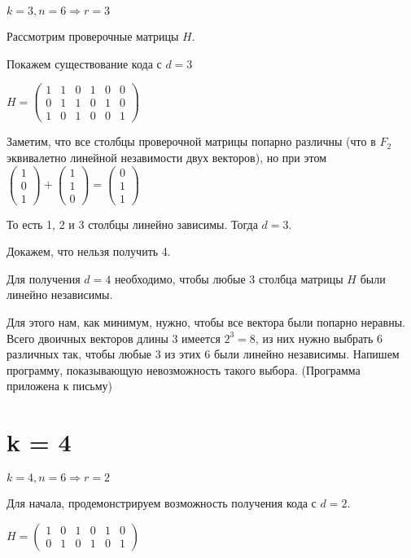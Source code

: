 \documentclass{article}
\begin{document}
	$k = 3, n = 6 \Rightarrow r = 3$
	
	Рассмотрим проверочные матрицы  $H$.
	
	Покажем существование кода с $d = 3$
	
	$
	H = \left(
	\begin{array}{cccccc}
	1&1&0&1&0&0\\
	0&1&1&0&1&0\\
	1&0&1&0&0&1
	\end{array}
	\right)
	$
	
	Заметим, что все столбцы проверочной матрицы попарно различны (что в $F_2$ эквивалетно линейной незавимости двух векторов), но при этом $
	\left(
	\begin{array}{cccccc}
	1\\
	0\\
	1
	\end{array}
	\right) + 
	\left(
	\begin{array}{cccccc}
	1\\
	1\\
	0
	\end{array}
	\right) = 
	\left(
	\begin{array}{cccccc}
	0\\
	1\\
	1
	\end{array}
	\right)
	$
	
	То есть 1, 2 и 3 столбцы линейно зависимы. Тогда $d = 3$.
	
	Докажем, что нельзя получить 4.
	
	Для получения $d = 4$ необходимо, чтобы любые 3 столбца матрицы $H$ были линейно независимы.
	
	Для этого нам, как минимум, нужно, чтобы все вектора были попарно неравны. Всего двоичных векторов длины $3$ имеется $2^3 = 8$, из них нужно выбрать 6 различных так, чтобы любые 3 из этих 6 были линейно независимы. Напишем программу, показывающую невозможность такого выбора. (Программа приложена к письму)
	
	\section{k = 4}
	
	$k = 4, n = 6 \Rightarrow r = 2$
	
	Для начала, продемонстрируем возможность получения кода с $d = 2$.
	
	$
	H = \left(
	\begin{array}{cccccc}
	1&0&1&0&1&0\\
	0&1&0&1&0&1
	\end{array}
	\right)
	$
	
\end{document}
